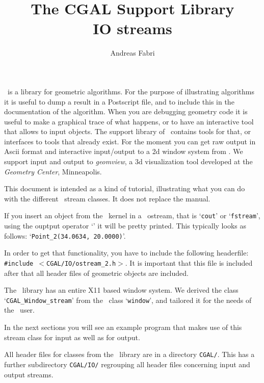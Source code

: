 \documentclass[]{article}
\begin{document}
\title{\bf The CGAL Support Library\\
           IO streams}
\author{Andreas Fabri}
\date{}
\maketitle


\cgal\ is a library for geometric algorithms. For the purpose of
illustrating algorithms it is useful to dump a result in a Postscript
file, and to include this in the documentation of the algorithm. When
you are debugging geometry code it is useful to make a graphical trace
of what happens, or to have an interactive tool that allows to input
objects.  The support library of \cgal\ contains tools for that, or
interfaces to tools that already exist. For the moment you can get raw
output in {\sc Ascii} format and interactive input/output to a 2d
window system from \leda. We support input and output to {\em
geomview}, a 3d visualization tool developed at the {\em Geometry
Center}, Minneapolis.

This document is intended as a kind of tutorial, illustrating
what you can do with the different \cgal\ stream classes. It does
not replace the manual.


If you insert an object from the \cgal\ kernel in a \CC\ ostream, that
is `{\tt cout}' or `{\tt fstream}', using the ouptput operator `\opout' it
will be pretty printed.  This typically looks as follows:
`{\tt Point\_2(34.0634, 20.0000)}'.

In order to get that functionality, you have to include the following
headerfile:  {\tt \#include $<$CGAL/IO/ostream\_2.h$>$}. It is important
that this file is included after that all header files of geometric
objects are included.




The \leda\ library has an entire X11 based window system. We derived
the class `{\tt CGAL\_Window\_stream}' from the \leda\ class `{\tt window}',
and tailored it for the needs of the \cgal\ user.

In the next sections you will see an example program that makes
use of this stream class for input as well as for output.


All header files for classes from the \cgal\ library are in a directory
{\tt CGAL/}.  This has a further subdirectory {\tt CGAL/IO/} regrouping all
header files concerning input and output streams.
\end{document}
